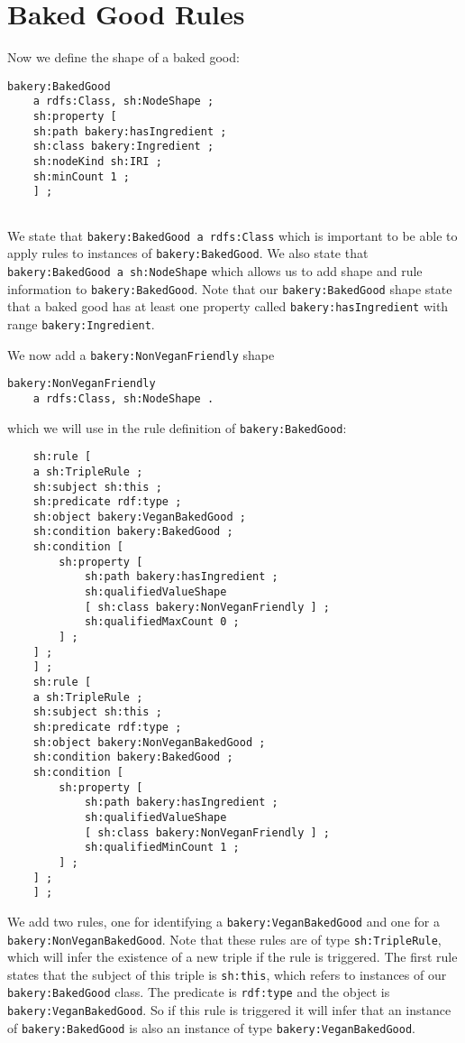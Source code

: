 \documentclass{amsart}
\begin{document}
  
  
  \section{Baked Good Rules}
Now we define the shape of a baked good:  
  \begin{small}
  \begin{Verbatim}   
bakery:BakedGood
    a rdfs:Class, sh:NodeShape ;
    sh:property [
	sh:path bakery:hasIngredient ;
	sh:class bakery:Ingredient ;
	sh:nodeKind sh:IRI ;
	sh:minCount 1 ;
    ] ;
  
  \end{Verbatim}
  \end{small}
  We state that \texttt{bakery:BakedGood a rdfs:Class} which is important to be able to apply rules to instances of \texttt{bakery:BakedGood}. We also state that \texttt{bakery:BakedGood a sh:NodeShape} which allows us to add shape and rule information to \texttt{bakery:BakedGood}. Note that our \texttt{bakery:BakedGood} shape state that a baked good has at least one property called \texttt{bakery:hasIngredient} with range \texttt{bakery:Ingredient}.
  
  We now add a \texttt{bakery:NonVeganFriendly} shape 
  \begin{small}
  \begin{Verbatim}   
bakery:NonVeganFriendly
    a rdfs:Class, sh:NodeShape . 
  \end{Verbatim}
  \end{small}
  which we will use in the rule definition of \texttt{bakery:BakedGood}:  
  \begin{small}
  \begin{Verbatim}   
    sh:rule [
	a sh:TripleRule ;
	sh:subject sh:this ;
	sh:predicate rdf:type ;
	sh:object bakery:VeganBakedGood ;
	sh:condition bakery:BakedGood ;
	sh:condition [
	    sh:property [
		    sh:path bakery:hasIngredient ;
		    sh:qualifiedValueShape 
			[ sh:class bakery:NonVeganFriendly ] ;
		    sh:qualifiedMaxCount 0 ;
	    ] ;
	] ;
    ] ; 
    sh:rule [
	a sh:TripleRule ;
	sh:subject sh:this ;
	sh:predicate rdf:type ;
	sh:object bakery:NonVeganBakedGood ;
	sh:condition bakery:BakedGood ;
	sh:condition [
	    sh:property [
		    sh:path bakery:hasIngredient ;
		    sh:qualifiedValueShape 
			[ sh:class bakery:NonVeganFriendly ] ;
		    sh:qualifiedMinCount 1 ;
	    ] ;
	] ;
    ] ;
  \end{Verbatim}
  \end{small}  
  We add two rules, one for identifying a \texttt{bakery:VeganBakedGood} and one for a \texttt{bakery:NonVeganBakedGood}. Note that these rules are of type \texttt{sh:TripleRule}, which will infer the existence of a new triple if the rule is triggered. The first rule states that the subject of this triple is \texttt{sh:this}, which refers to instances of our \texttt{bakery:BakedGood} class. The predicate is \texttt{rdf:type} and the object is \texttt{bakery:VeganBakedGood}. So if this rule is triggered it will infer that an instance of \texttt{bakery:BakedGood} is also an instance of type \texttt{bakery:VeganBakedGood}. 
  
\end{document}
